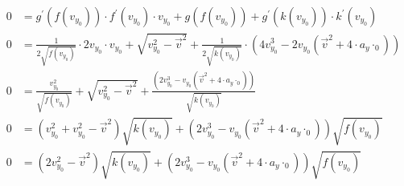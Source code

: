 \documentclass[sectionformat = aufgabe]{gadsescript}
\begin{document}
\begin{enumerate}[label=\alph*)]
\begin{align*}
			0 &=  g^\prime(f(v_{y_0}))\cdot f^\prime(v_{y_0}) \cdot v_{y_0} + g(f(v_{y_0})) + g^\prime(k(v_{y_0}))\cdot k^\prime(v_{y_0})  \\
			0 &=  \frac{1}{2\sqrt{f(v_{y_0})}}\cdot 2v_{y_0} \cdot v_{y_0} + \sqrt{v_{y_0}^2 - \vec v^2} + \frac{1}{2 \sqrt{k(v_{y_0})}} \cdot (4 v_{y_0}^3 - 2v_{y_0} \left ( \vec v ^2 + 4 \cdot a_y \cdot_0 \right))  \\
			0 &=  \frac{v_{y_0}^2}{\sqrt{f(v_{y_0})}} + \sqrt{v_{y_0}^2 - \vec v^2} + \frac{(2 v_{y_0}^3 - v_{y_0} \left ( \vec v ^2 + 4 \cdot a_y \cdot_0 \right))}{\sqrt{k(v_{y_0})}}  \\
			0 &=  \left( v_{y_0}^2 + v_{y_0}^2 - \vec v^2 \right) \sqrt{k(v_{y_0})} + (2 v_{y_0}^3 - v_{y_0} \left ( \vec v ^2 + 4 \cdot a_y \cdot_0 \right))\sqrt{f(v_{y_0})}  \\
			0 &=  \left( 2v_{y_0}^2 - \vec v^2 \right) \sqrt{k(v_{y_0})} + (2 v_{y_0}^3 - v_{y_0} \left ( \vec v ^2 + 4 \cdot a_y \cdot_0 \right))\sqrt{f(v_{y_0})}  \\
		\end{align*}

\end{enumerate}
\end{document}
